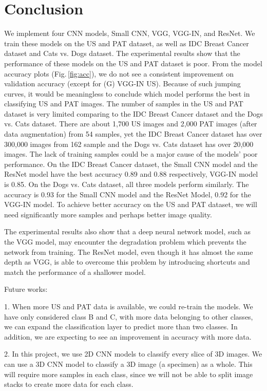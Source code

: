 \chapter{Conclusion} 
\label{conclusion}

We implement four CNN models, Small CNN, VGG, VGG-IN, and ResNet. We train these models on the US and PAT dataset, as well as IDC Breast Cancer dataset and Cats vs. Dogs dataset. The experimental results show that the performance of these models on the US and PAT dataset is poor. From the model accuracy plots (Fig.\,\ref{fig:acc}), we do not see a consistent improvement on validation accuracy (except for (G) VGG-IN US). Because of such jumping curves, it would be meaningless to conclude which model performs the best in classifying US and PAT images. The number of samples in the US and PAT dataset is very limited comparing to the IDC Breast Cancer dataset and the Dogs vs. Cats dataset. There are about 1,700 US images and 2,000 PAT images (after data augmentation) from 54 samples, yet the IDC Breast Cancer dataset has over 300,000 images from 162 sample and the Dogs vs. Cats dataset has over 20,000 images. The lack of training samples could be a major cause of the models' poor performance.
On the IDC Breast Cancer dataset, the Small CNN model and the ResNet model have the best accuracy 0.89 and 0.88 respectively, VGG-IN model is 0.85. On the Dogs vs. Cats dataset, all three models perform similarly. The accuracy is 0.93 for the Small CNN model and the ResNet Model, 0.92 for the VGG-IN model. 
To achieve better accuracy on the US and PAT dataset, we will need significantly more samples and perhaps better image quality.

The experimental results also show that a deep neural network model, such as the VGG model, may encounter the degradation problem which prevents the network from training. The ResNet model, even though it has almost the same depth as VGG, is able to overcome this problem by introducing shortcuts and match the performance of a shallower model. 

Future works:

1. When more US and PAT data is available, we could re-train the models. We have only considered class B and C, with more data belonging to other classes, we can expand the classification layer to predict more than two classes. In addition, we are expecting to see an improvement in accuracy with more data.

2. In this project, we use 2D CNN models to classify every slice of 3D images. We can use a 3D CNN model \citep{tran2015learning} to classify a 3D image (a specimen) as a whole. This will require more samples in each class, since we will not be able to split image stacks to create more data for each class.
